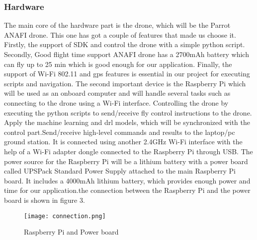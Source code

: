 \documentclass[../main.tex]{subfiles}
\begin{document}
\subsubsection{Hardware}
The main core of the hardware part is the drone, which will be the Parrot ANAFI drone. This one has got a couple of features that made us choose it. Firstly, the support of SDK and control the drone with a simple python script. Secondly, Good flight time support ANAFI drone has a 2700mAh battery which can fly up to 25 min which is good enough for our application. Finally, the support of Wi-Fi 802.11 and \gls{gps} features is essential in our project for executing scripts and navigation. The second important device is the Raspberry Pi which will be used as an onboard computer and will handle several tasks such as connecting to the drone using a Wi-Fi interface. Controlling the drone by executing the python scripts to send/receive fly control instructions to the drone. Apply the machine learning and \gls{drl} models, which will be synchronized with the control part.Send/receive high-level commands and results to the laptop/pc ground station. It is connected using another 2.4GHz Wi-Fi interface with the help of a Wi-Fi adapter dongle connected to the Raspberry Pi through USB. The power source for the Raspberry Pi will be a lithium battery with a power board called UPSPack Standard Power Supply attached to the main Raspberry Pi board. It includes a 4000mAh lithium battery, which provides enough power and time for our application.the connection between the Raspberry Pi and the power board is shown in figure 3.
\begin{figure}[H]
	\centering
	\texttt{[image: connection.png]}
	\caption{Raspberry Pi and Power board}\label{fig3:connection}
\end{figure}     
\end{document}
